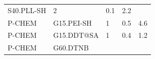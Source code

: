 \documentclass[utf8]{frontiersHLTH} %
\begin{document}
\begin{longtable}[]{@{}lllll@{}}
\begin{minipage}[t]{0.21\columnwidth}
S40.PLL-SH\strut
\end{minipage} & \begin{minipage}[t]{0.06\columnwidth}\raggedright\strut
2\strut
\end{minipage} & \begin{minipage}[t]{0.15\columnwidth}\raggedright\strut
0.1\strut
\end{minipage} & \begin{minipage}[t]{0.08\columnwidth}\raggedright\strut
2.2\strut
\end{minipage}\tabularnewline
\begin{minipage}[t]{0.26\columnwidth}\raggedright\strut
P-CHEM\strut
\end{minipage} & \begin{minipage}[t]{0.21\columnwidth}\raggedright\strut
G15.PEI-SH\strut
\end{minipage} & \begin{minipage}[t]{0.06\columnwidth}\raggedright\strut
1\strut
\end{minipage} & \begin{minipage}[t]{0.15\columnwidth}\raggedright\strut
0.5\strut
\end{minipage} & \begin{minipage}[t]{0.08\columnwidth}\raggedright\strut
4.6\strut
\end{minipage}\tabularnewline
\begin{minipage}[t]{0.26\columnwidth}\raggedright\strut
P-CHEM\strut
\end{minipage} & \begin{minipage}[t]{0.21\columnwidth}\raggedright\strut
G15.DDT@SA\strut
\end{minipage} & \begin{minipage}[t]{0.06\columnwidth}\raggedright\strut
1\strut
\end{minipage} & \begin{minipage}[t]{0.15\columnwidth}\raggedright\strut
0.4\strut
\end{minipage} & \begin{minipage}[t]{0.08\columnwidth}\raggedright\strut
1.2\strut
\end{minipage}\tabularnewline
\begin{minipage}[t]{0.26\columnwidth}\raggedright\strut
P-CHEM\strut
\end{minipage} & \begin{minipage}[t]{0.21\columnwidth}\raggedright\strut
G60.DTNB\strut
\end{minipage} & \begin{minipage}[t]{0.06\columnwidth}\raggedright\strut

\end{minipage}
\end{longtable}
\end{document}
